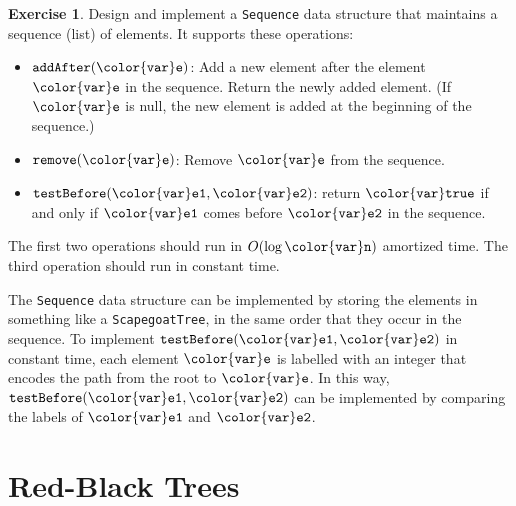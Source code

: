 \documentclass[10pt]{book}
\newcommand{\chaplabel}[1]{\label{chap:#1}}
\theoremstyle{plain}
\theoremstyle{definition}
\newtheorem{exc}{Exercise}[chapter]
\newcommand{\exclabel}[1]{\label{exc:#1}}
\begin{document}
\begin{exc}\exclabel{list-order-maintenance}
  Design and implement a \texttt{Sequence} data structure that maintains a
  sequence (list) of elements.  It supports these operations:
  \begin{itemize}
    \item \ensuremath{\mathtt{addAfter({\color{var}e})}}: Add a new element after the element \ensuremath{\mathtt{{\color{var}e}}} in the
    sequence.  Return the newly added element.  (If \ensuremath{\mathtt{{\color{var}e}}} is null,
    the new element is added at the beginning of the sequence.)
    \item \ensuremath{\mathtt{remove({\color{var}e})}}: Remove \ensuremath{\mathtt{{\color{var}e}}} from the sequence.
    \item \ensuremath{\mathtt{testBefore({\color{var}e1},{\color{var}e2})}}: return \ensuremath{\mathtt{{\color{var}true}}} if and only if \ensuremath{\mathtt{{\color{var}e1}}} comes
    before \ensuremath{\mathtt{{\color{var}e2}}} in the sequence.
  \end{itemize}
  The first two operations should run in $O(\log \ensuremath{\mathtt{{\color{var}n}}})$ amortized time.
  The third operation should run in constant time.

  The \texttt{Sequence} data structure can be implemented by storing the elements
  in something like a \texttt{ScapegoatTree}, in the same order that they occur
  in the sequence.  To implement \ensuremath{\mathtt{testBefore({\color{var}e1},{\color{var}e2})}} in constant time,
  each element \ensuremath{\mathtt{{\color{var}e}}} is labelled with an integer that encodes the path from
  the root to \ensuremath{\mathtt{{\color{var}e}}}.  In this way, \ensuremath{\mathtt{testBefore({\color{var}e1},{\color{var}e2})}} can be implemented
  by comparing the labels of \ensuremath{\mathtt{{\color{var}e1}}} and \ensuremath{\mathtt{{\color{var}e2}}}.
\end{exc}


\clearpage

\clearpage
\chapter{Red-Black Trees}
\chaplabel{redblack}
\end{document}
